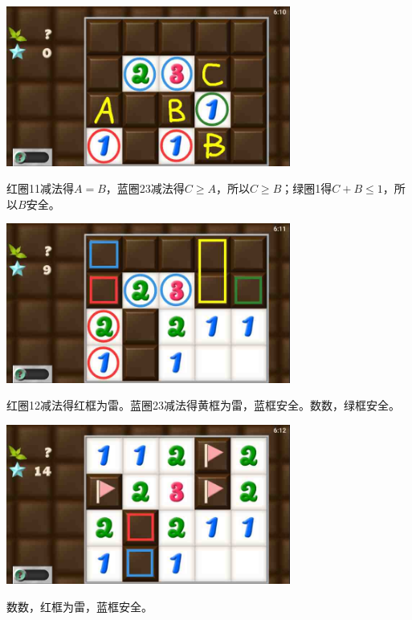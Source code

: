 \subsection{} %
\begin{center}
    \includegraphics[width=0.7\textwidth]{puzzlelow/193-1.jpg}
\end{center}
红圈11减法得$A=B$，蓝圈23减法得$C\ge A$，所以$C\ge B$；绿圈1得$C+B\le 1$，所以$B$安全。
\begin{center}
    \includegraphics[width=0.7\textwidth]{puzzlelow/193-2.jpg}
\end{center}
红圈12减法得红框为雷。蓝圈23减法得黄框为雷，蓝框安全。数数，绿框安全。
\begin{center}
    \includegraphics[width=0.7\textwidth]{puzzlelow/193-3.jpg}
\end{center}
数数，红框为雷，蓝框安全。

